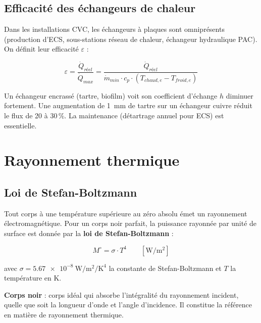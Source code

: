 \subsection{Efficacité des échangeurs de chaleur}

Dans les installations CVC, les échangeurs à plaques sont omniprésents (production d'ECS, sous-stations réseau de chaleur, échangeur hydraulique PAC). On définit leur efficacité $\varepsilon$ :

\begin{equation}
  \varepsilon = \frac{\dot{Q}_{réel}}{\dot{Q}_{max}} = \frac{\dot{Q}_{réel}}{\dot{m}_{min} \cdot c_p \cdot (T_{chaud,e} - T_{froid,e})}
\end{equation}

\begin{attention}
  Un échangeur encrassé (tartre, biofilm) voit son coefficient d'échange $h$ diminuer fortement. Une augmentation de \SI{1}{\milli\metre} de tartre sur un échangeur cuivre réduit le flux de 20 à 30\,\%. La maintenance (détartrage annuel pour ECS) est essentielle.
\end{attention}

\section{Rayonnement thermique}

\subsection{Loi de Stefan-Boltzmann}

Tout corps à une température supérieure au zéro absolu émet un rayonnement électromagnétique.
Pour un corps noir parfait, la puissance rayonnée par unité de surface est donnée par la
\textbf{loi de Stefan-Boltzmann} :

\begin{equation}
  M^{\circ} = \sigma \cdot T^4
  \qquad \left[\si{\watt\per\meter\squared}\right]
  \label{eq:stefan_boltzmann}
\end{equation}

avec \(\sigma = \SI{5,67e-8}{\watt\per\meter\squared\per\kelvin\tothe{4}}\) la constante
de Stefan-Boltzmann et \(T\) la température en \si{\kelvin}.

\begin{definition}
  \textbf{Corps noir} : corps idéal qui absorbe l'intégralité du rayonnement incident, quelle
  que soit la longueur d'onde et l'angle d'incidence. Il constitue la référence en matière de
  rayonnement thermique.
\end{definition}


